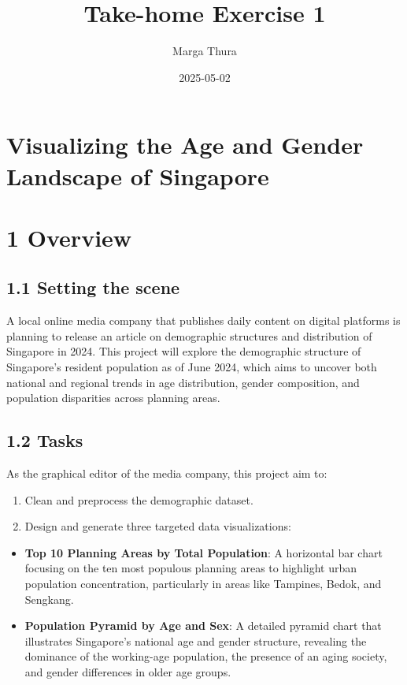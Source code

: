 \documentclass[
  letterpaper,
  DIV=11,
  numbers=noendperiod]{scrartcl}
\title{Take-home Exercise 1}
\author{Marga Thura}
\date{2025-05-02}
\begin{document}
\maketitle


\section{\texorpdfstring{\textbf{Visualizing the Age and Gender
Landscape of
Singapore}}{Visualizing the Age and Gender Landscape of Singapore}}\label{visualizing-the-age-and-gender-landscape-of-singapore}

\section{1 Overview}\label{overview}

\subsection{1.1 Setting the scene}\label{setting-the-scene}

A local online media company that publishes daily content on digital
platforms is planning to release an article on demographic structures
and distribution of Singapore in 2024. This project will explore the
demographic structure of Singapore's resident population as of June
2024, which aims to uncover both national and regional trends in age
distribution, gender composition, and population disparities across
planning areas.

\subsection{1.2 Tasks}\label{tasks}

As the graphical editor of the media company, this project aim to:

\begin{enumerate}
\def\labelenumi{\arabic{enumi}.}
\item
  Clean and preprocess the demographic dataset.
\item
  Design and generate three targeted data visualizations:
\end{enumerate}

\begin{itemize}
\item
  \textbf{Top 10 Planning Areas by Total Population}: A horizontal bar
  chart focusing on the ten most populous planning areas to highlight
  urban population concentration, particularly in areas like Tampines,
  Bedok, and Sengkang.
\item
  \textbf{Population Pyramid by Age and Sex}: A detailed pyramid chart
  that illustrates Singapore's national age and gender structure,
  revealing the dominance of the working-age population, the presence of
  an aging society, and gender differences in older age groups.
\end{itemize}
\end{document}
